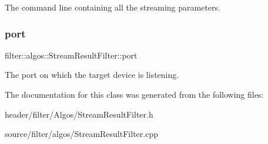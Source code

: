 The command line containing all the streaming parameters. \mbox{\label{classfilter_1_1algos_1_1_stream_result_filter_aa04a6b95545ed560dc51892ee87fb0ae}} 
\subsubsection{\texorpdfstring{port}{port}}
{\footnotesize\ttfamily filter\+::algos\+::\+Stream\+Result\+Filter\+::port}

The port on which the target device is listening. 

The documentation for this class was generated from the following files\+:\begin{DoxyCompactItemize}
\item 
header/filter/\+Algos/Stream\+Result\+Filter.\+h\item 
source/filter/algos/Stream\+Result\+Filter.\+cpp\end{DoxyCompactItemize}
